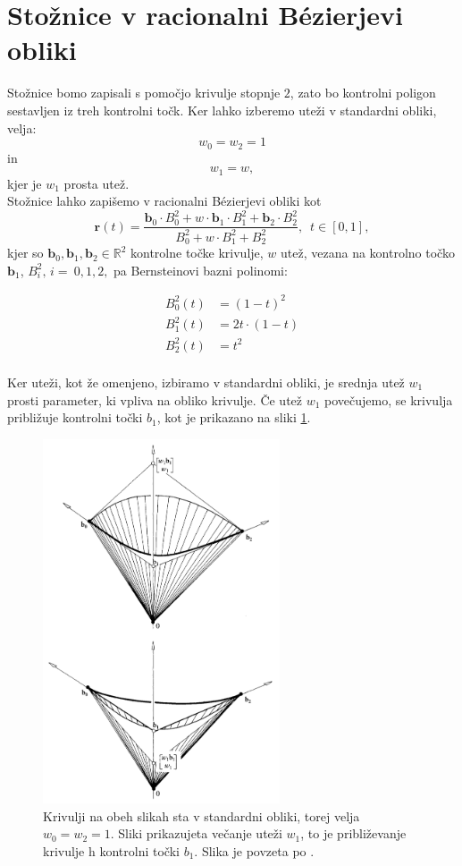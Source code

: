 \documentclass[a4paper,11pt]{article}
\theoremstyle{definition}
\theoremstyle{plain}
\begin{document}

\section{Stožnice v racionalni B\'ezierjevi obliki}
Stožnice bomo zapisali s pomočjo krivulje stopnje $2$, zato bo kontrolni poligon sestavljen iz treh kontrolni točk. Ker lahko izberemo uteži v standardni obliki, velja: 
$$w_0=w_2=1 $$
in
$$ w_1=w,$$
kjer je $w_1$ prosta utež.
\\
Stožnice lahko zapišemo v racionalni B\'ezierjevi obliki kot 
$$\boldsymbol{r}(t)=\frac{\boldsymbol{b}_0\cdot B_0^2+w\cdot\boldsymbol{b}_1\cdot B_1^2+\boldsymbol{b}_2\cdot B_2^2}{ B_0^2+w\cdot B_1^2+ B_2^2},\,\,\, t\in[0,1],$$
kjer so $\boldsymbol{b}_0, \boldsymbol{b}_1, \boldsymbol{b}_2 \in \mathbb{R}^2$ kontrolne točke krivulje, $w$ utež, vezana na kontrolno točko $\boldsymbol{b}_1$, $B_i^2,\,i=~0,1,2,$ pa Bernsteinovi bazni polinomi:

\begin{align*}
B_0^2(t) &= (1-t)^2 \\
B_1^2(t) &= 2t\cdot(1-t) \\
B_2^2(t) &= t^2 \\
\end{align*}

Ker uteži, kot že omenjeno, izbiramo v standardni obliki, je srednja utež $w_1$ prosti parameter, ki vpliva na obliko krivulje. Če utež $w_1$ povečujemo, se krivulja približuje kontrolni točki $b_1$, kot je prikazano na sliki \ref{slika:w1}.

\begin{figure}[ht!]
    \centering
    \includegraphics[width=70mm]{vecanje_w1.png}
    \caption{Krivulji na obeh slikah sta v standardni obliki, torej velja $w_0 = w_2 = 1$. Sliki prikazujeta večanje uteži $w_1$, to je približevanje krivulje h kontrolni točki $b_1$. Slika je povzeta po \cite{farin}.}
    \label{slika:w1}
\end{figure}
\end{document}
